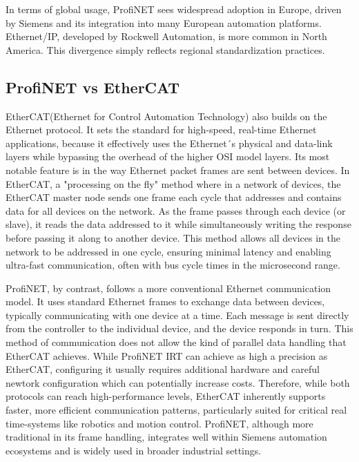\documentclass[conference]{IEEEtran}
\begin{document}
In terms of global usage, ProfiNET sees widespread adoption in Europe, driven by Siemens and its integration into many European automation platforms. Ethernet/IP, developed by Rockwell Automation, is more common in North America. This divergence simply reflects regional standardization practices.


\subsection{ProfiNET vs EtherCAT}
EtherCAT(Ethernet for Control Automation Technology) also builds on the Ethernet protocol. It sets the standard for high-speed, real-time Ethernet applications\cite{Rostan2010EtherCAT}, because it effectively uses the Ethernet´s physical and data-link layers while bypassing the overhead of the higher OSI model layers. Its most notable feature is in the way Ethernet packet frames are sent between devices. In EtherCAT, a "processing on the fly" method where in a network of devices, the EtherCAT master node sends one frame each cycle that addresses and contains data for all devices on the network. As the frame passes through each device (or slave), it reads the data addressed to it while simultaneously writing the response before passing it along to another device\cite{DewesoftEtherCAT2023}. This method allows all devices in the network to be addressed in one cycle, ensuring minimal latency and enabling ultra-fast communication, often with bus cycle times in the microsecond range\cite{Rostan2010EtherCAT}.

ProfiNET, by contrast, follows a more conventional Ethernet communication model. It uses standard Ethernet frames to exchange data between devices, typically communicating with one device at a time. Each message is sent directly from the controller to the individual device, and the device responds in turn. This method of communication does not allow the kind of parallel data handling that EtherCAT achieves. While ProfiNET IRT can achieve as high a precision as EtherCAT, configuring it usually requires additional hardware and careful newtork configuration \cite{WuXie2019} which can potentially increase costs.
Therefore, while both protocols can reach high-performance levels, EtherCAT inherently supports faster, more efficient communication patterns, particularly suited for critical real time-systems like robotics and motion control\cite{BeckhoffETG2023}. ProfiNET, although more traditional in its frame handling, integrates well within Siemens automation ecosystems and is widely used in broader industrial settings\cite{Eitel2020EtherNetVsPROFINET}.
\end{document}
